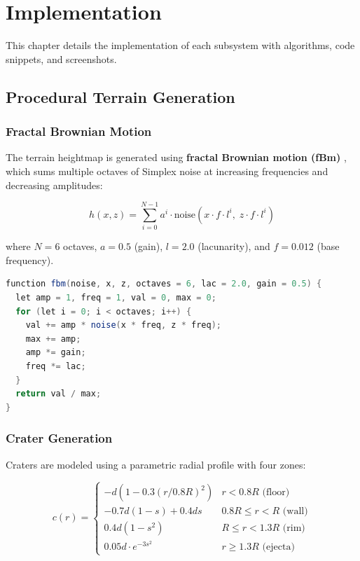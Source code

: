 \chapter{Implementation}

This chapter details the implementation of each subsystem with algorithms, code snippets, and screenshots.

\section{Procedural Terrain Generation}

\subsection{Fractal Brownian Motion}
The terrain heightmap is generated using \textbf{fractal Brownian motion (fBm)} \cite{musgrave1989terrain}, which sums multiple octaves of Simplex noise \cite{perlin1985noise} at increasing frequencies and decreasing amplitudes:

\begin{equation}
h(x,z) = \sum_{i=0}^{N-1} a^i \cdot \text{noise}\!\left(x \cdot f \cdot l^i,\; z \cdot f \cdot l^i\right)
\label{eq:fbm}
\end{equation}

where $N=6$ octaves, $a=0.5$ (gain), $l=2.0$ (lacunarity), and $f=0.012$ (base frequency).

\begin{lstlisting}[language=Java, caption={Fractal Brownian Motion Implementation}]
function fbm(noise, x, z, octaves = 6, lac = 2.0, gain = 0.5) {
  let amp = 1, freq = 1, val = 0, max = 0;
  for (let i = 0; i < octaves; i++) {
    val += amp * noise(x * freq, z * freq);
    max += amp;
    amp *= gain;
    freq *= lac;
  }
  return val / max;
}
\end{lstlisting}

\subsection{Crater Generation}
Craters are modeled using a parametric radial profile with four zones:

\begin{equation}
c(r) = \begin{cases}
-d(1 - 0.3(r/0.8R)^2) & r < 0.8R \text{ (floor)} \\
-0.7d(1-s) + 0.4ds & 0.8R \leq r < R \text{ (wall)} \\
0.4d(1 - s^2) & R \leq r < 1.3R \text{ (rim)} \\
0.05d \cdot e^{-3s^2} & r \geq 1.3R \text{ (ejecta)}
\end{cases}
\end{equation}

